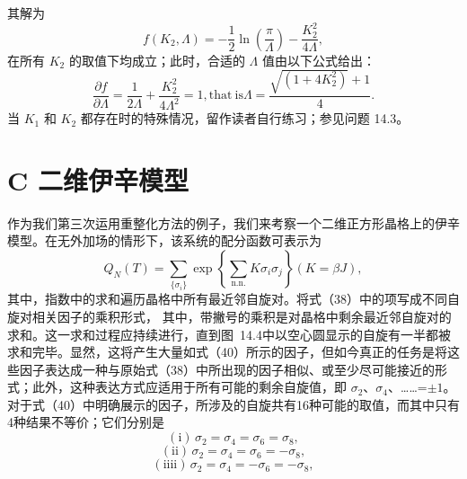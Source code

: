 其解为
\begin{equation}\tag{14.2.42}\label{eq:14.2.42}
f ( K _ { 2 } , \Lambda ) = - \frac { 1 } { 2 } \ln \left( \frac { \pi } { \Lambda } \right) - \frac { K _ { 2 } ^{2} } { 4 \Lambda } ,
\end{equation}
在所有 \(K_2\) 的取值下均成立；此时，合适的 \(\Lambda\) 值由以下公式给出：
\begin{equation}\tag{14.2.43}\label{eq:14.2.43}
\frac { \partial f } { \partial \Lambda } = \frac { 1 } { 2 \Lambda } + \frac { K _ { 2 } ^{2} } { 4 \Lambda ^{2} } = 1 ,  \mathrm { t h a t ~ i s }  \Lambda = \frac { \sqrt { ( 1 + 4 K _ { 2 } ^{2} ) } + 1 } { 4 } .
\end{equation}
当 \(K_{1}\) 和 \(K_{2}\) 都存在时的特殊情况，留作读者自行练习；参见问题 14.3。
\section{C 二维伊辛模型}\label{c-ux4e8cux7ef4ux4f0aux8f9bux6a21ux578b}
作为我们第三次运用重整化方法的例子，我们来考察一个二维正方形晶格上的伊辛模型。在无外加场的情形下，该系统的配分函数可表示为
\begin{equation}\tag{14.2.44}\label{eq:14.2.44}
Q _ { N } ( T ) = \sum _ { \{ \sigma _ { i } \} } \exp \left\{ \sum _ { \mathrm { n . n . } } K \sigma _ { i } \sigma _ { j } \right\}  ( K = \beta J ) ,
\end{equation}
其中，指数中的求和遍历晶格中所有最近邻自旋对。将式（38）中的项写成不同自旋对相关因子的乘积形式，
其中，带撇号的乘积是对晶格中剩余最近邻自旋对的求和。这一求和过程应持续进行，直到图~14.4中以空心圆显示的自旋有一半都被求和完毕。显然，这将产生大量如式（40）所示的因子，但如今真正的任务是将这些因子表达成一种与原始式（38）中所出现的因子相似、或至少尽可能接近的形式；此外，这种表达方式应适用于所有可能的剩余自旋值，即 \(\sigma_{2}\)、\(\sigma_{4}\)、\ldots\ldots=\(\pm 1\)。
对于式（40）中明确展示的因子，所涉及的自旋共有16种可能的取值，而其中只有4种结果不等价；它们分别是
\begin{equation}\tag{14.2.45}\label{eq:14.2.45}
( \mathrm { i } ) \, \sigma _ { 2 } = \sigma _ { 4 } = \sigma _ { 6 } = \sigma _ { 8 } ,
\end{equation}
\begin{equation}\tag{14.2.46}\label{eq:14.2.46}
( \mathrm { i i } ) \, \sigma _ { 2 } = \sigma _ { 4 } = \sigma _ { 6 } = - \sigma _ { 8 } ,
\end{equation}
\begin{equation}\tag{14.2.47}\label{eq:14.2.47}
( \mathrm { i i i i } ) \, \sigma _ { 2 } = \sigma _ { 4 } = - \sigma _ { 6 } = - \sigma _ { 8 } ,
\end{equation}
